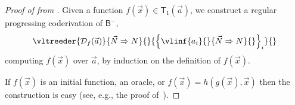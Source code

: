 \documentclass[manuscript,screen]{acmart}
\renewcommand{\emptyset}{\varnothing}
\theoremstyle{definition}
\theoremstyle{remark}
\newcommand{\n}{N}
\newcommand{\sq}{\Box}
\newcommand{\sqn}{{\sq\n}}
\newcommand{\sn}{\sqn}
\renewcommand{\succ}[1]{\mathsf{s}_{#1}}
\newcommand{\bc}{\mathsf{B}}
\newcommand{\bcnorec}{\bc^{-}}
\newcommand{\seqar}{\Rightarrow}
\newcommand{\der}{\mathcal{D}}
\newcommand{\cut}{\mathsf{cut}}
\newcommand{\boxrig}{\sq_r}
\newcommand{\sqr}{\boxrig}
\newcommand{\tgodel}{\mathsf{T}}
\newcommand{\ntgodel}[1]{\tgodel_{#1}}
\begin{document}
\begin{proof}[Proof of  from ]




Given a function $f(\vec x) \in \ntgodel 1 (\vec a)$, we construct a regular progressing coderivation of $\bcnorec$,
\[
\vltreeder{\der_f (\vec a)}{ \vec \n \seqar \n}{}{ \left\{
\vlinf{a_i}{}{ \vec \n \seqar \n}{}
\right\}_i }{}
\]
computing $f(\vec x)$ over $\vec a$, by induction on the definition of $f(\vec x)$.

If $f(\vec x)$ is an initial function,  an oracle, or $f(\vec x) = h(g(\vec x), \vec x)$ then the construction is easy (see, e.g., the proof of~).



\end{proof}
\end{document}
